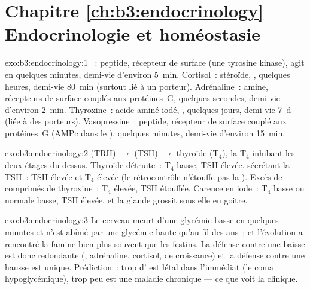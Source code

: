 \section*{Chapitre \ref{ch:b3:endocrinology} --- Endocrinologie et homéostasie}

\begin{solution}{exo:b3:endocrinology:1}
~: peptide, récepteur de surface (une tyrosine kinase), agit en
quelques minutes, demi-vie d'environ \qty{5}{min}. Cortisol~: stéroïde,
, quelques heures, demi-vie \qty{80}{min} (surtout
lié à un porteur). Adrénaline~: amine, récepteurs de surface couplés aux
protéines~G, quelques secondes, demi-vie d'environ \qty{2}{min}.
Thyroxine~: acide aminé iodé, , quelques jours,
demi-vie \qty{7}{d} (liée à des porteurs). Vasopressine~: peptide,
récepteur de surface couplé aux protéines~G (AMPc dans le ), quelques minutes, demi-vie d'environ \qty{15}{min}.
\end{solution}

\begin{solution}{exo:b3:endocrinology:2}
 (TRH) $\to$  (TSH) $\to$ thyroïde (T$_{4}$), la
T$_{4}$ inhibant les deux étages du dessus. Thyroïde détruite~: T$_{4}$
basse, TSH élevée.  sécrétant la TSH~: TSH élevée et T$_{4}$
élevée (le rétrocontrôle n'étouffe pas la ). Excès de comprimés de
thyroxine~: T$_{4}$ élevée, TSH étouffée. Carence en iode~: T$_{4}$
basse ou normale basse, TSH élevée, et la glande grossit sous elle en
goitre.
\end{solution}

\begin{solution}{exo:b3:endocrinology:3}
Le cerveau meurt d'une glycémie basse en quelques minutes et n'est
abîmé par une glycémie haute qu'au fil des ans~; et l'évolution a
rencontré la famine bien plus souvent que les festins. La défense contre
une baisse est donc redondante (, adrénaline, cortisol, 
de croissance) et la défense contre une hausse est unique. Prédiction~:
trop d' est létal dans l'immédiat (le coma hypoglycémique), trop
peu est une maladie chronique --- ce que voit la clinique.
\end{solution}


